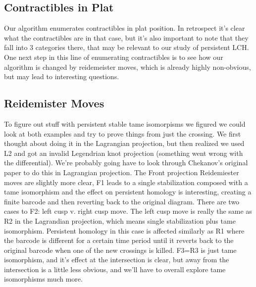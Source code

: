 \documentclass[11pt,oneside]{amsart}
\begin{document}
\subsection{Contractibles in Plat} Our algorithm enumerates contractibles in plat position. In retrospect it's clear what the contractibles are in that case, but it's also important to note that they fall into 3 categories there, that may be relevant to our study of persistent LCH. One next step in this line of enumerating contractibles is to see how our algorithm is changed by reidemeister moves, which is already highly non-obvious, but may lead to interesting questions.

\subsection{Reidemister Moves} To figure out stuff with persistent stable tame isomorpisms we figured we could look at both examples and try to prove things from just the crossing. We first thought about doing it in the Lagrangian projection, but then realized we used L2 and got an invalid Legendrian knot projection (something went wrong with the differential). We're probably going have to look through Chekanov's original paper to do this in Lagrangian projection. The Front projection Reidemiester moves are slightly more clear, F1 leads to a single stabilization composed with a tame isomorphism and the effect on persistent homology is interesting, creating a finite barcode and then reverting back to the original diagram. There are two cases to F2: left cusp v. right cusp move. The left cusp move is really the same as R2 in the Lagrandian projection, which means single stabilization plus tame isomorphism. Persistent homology in this case is affected similarly as R1 where the barcode is different for a certain time period until it reverts back to the original barcode when one of the new crossings is killed. F3=R3 is just tame isomorphism, and it's effect at the intersection is clear, but away from the intersection is a little less obvious, and we'll have to overall explore tame isomorphisms much more.
\end{document}
